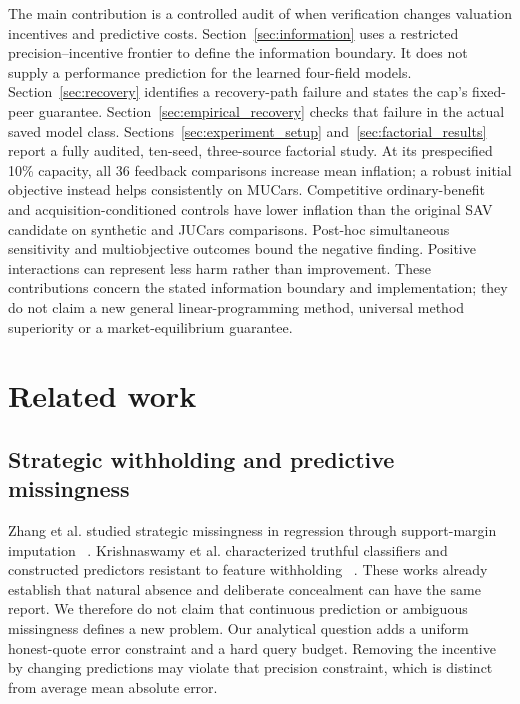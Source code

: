 \documentclass[11pt]{article}
\begin{document}
The main contribution is a controlled audit of when verification changes valuation incentives and predictive costs.
Section~\ref{sec:information} uses a restricted precision--incentive frontier to define the information boundary. It does not supply a performance prediction for the learned four-field models. Section~\ref{sec:recovery} identifies a recovery-path failure and states the cap's fixed-peer guarantee. Section~\ref{sec:empirical_recovery} checks that failure in the actual saved model class. Sections~\ref{sec:experiment_setup}
and~\ref{sec:factorial_results} report a fully audited, ten-seed, three-source
factorial study. At its prespecified 10\% capacity, all 36 feedback comparisons
increase mean inflation; a robust initial objective instead helps consistently
on MUCars. Competitive ordinary-benefit and acquisition-conditioned controls have lower inflation than the original SAV candidate on synthetic and JUCars comparisons. Post-hoc simultaneous sensitivity and multiobjective outcomes bound the negative finding. Positive interactions can represent less harm rather than improvement. These contributions concern the stated information boundary and
implementation; they do not claim a new general linear-programming method,
universal method superiority or a market-equilibrium guarantee.

\section{Related work}\label{sec:related}
\subsection{Strategic withholding and predictive missingness}
Zhang et al. studied strategic missingness in regression through support-margin
imputation ~\cite{smi}. Krishnaswamy et al. characterized truthful classifiers
and constructed predictors resistant to feature withholding ~\cite{withheld}.
These works already establish that natural absence and deliberate concealment
can have the same report. We therefore do not claim that continuous prediction
or ambiguous missingness defines a new problem. Our analytical question adds a
uniform honest-quote error constraint and a hard query budget. Removing the
incentive by changing predictions may violate that precision constraint, which
is distinct from average mean absolute error.
\end{document}
